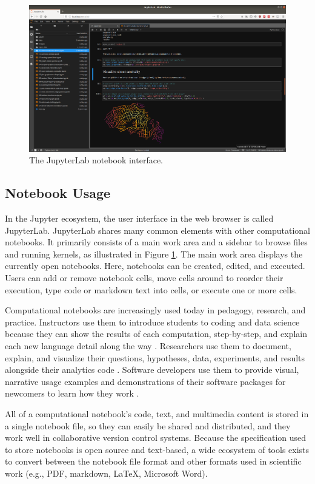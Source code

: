 \documentclass[11pt,letterpaper]{article}
\begin{document}
\begin{figure}[tbp]
	\centering
	\includegraphics[width=1\textwidth]{jupyterlab-interface.png}
	\caption{The JupyterLab notebook interface.}
	\label{fig:jupyterlab_interface}
\end{figure}

\subsection{Notebook Usage}

In the Jupyter ecosystem, the user interface in the web browser is called JupyterLab. JupyterLab shares many common elements with other computational notebooks. It primarily consists of a main work area and a sidebar to browse files and running kernels, as illustrated in Figure \ref{fig:jupyterlab_interface}. The main work area displays the currently open notebooks. Here, notebooks can be created, edited, and executed. Users can add or remove notebook cells, move cells around to reorder their execution, type code or markdown text into cells, or execute one or more cells.

Computational notebooks are increasingly used today in pedagogy, research, and practice. Instructors use them to introduce students to coding and data science because they can show the results of each computation, step-by-step, and explain each new language detail along the way \citep{reades_teaching_2020}. Researchers use them to document, explain, and visualize their questions, hypotheses, data, experiments, and results alongside their analytics code \citep{perkel_why_2018}. Software developers use them to provide visual, narrative usage examples and demonstrations of their software packages for newcomers to learn how they work \citep{boeing_urban_2020}.

All of a computational notebook's code, text, and multimedia content is stored in a single notebook file, so they can easily be shared and distributed, and they work well in collaborative version control systems. Because the specification used to store notebooks is open source and text-based, a wide ecosystem of tools exists to convert between the notebook file format and other formats used in scientific work (e.g., PDF, markdown, LaTeX, Microsoft Word).
\end{document}

